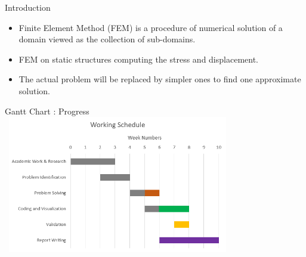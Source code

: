 \documentclass{beamer}
\begin{document}
\begin{frame}{Introduction}
\begin{itemize}
    \item  Finite Element Method (FEM) is a procedure of numerical solution of a domain viewed as the collection of sub-domains.
    \vspace{0.6cm}
    \item FEM on static structures computing the stress and displacement.
    \vspace{0.6cm}
    \item The actual problem will be replaced by simpler ones to find one approximate solution. 
\end{itemize}
    
\end{frame}


\begin{frame}{Gantt Chart : Progress}
\includegraphics[width = 10cm, height = 6cm]{progress.png}
\end{frame}
\end{document}
